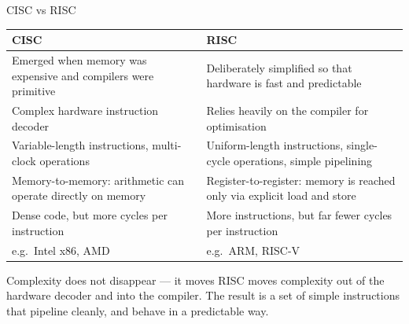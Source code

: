 \documentclass[9pt,aspectratio=169,xcolor=table]{beamer}
\newcommand{\striped}{\rowcolors{1}{white}{stripe}}
\begin{document}
\begin{frame}{CISC vs RISC}
    \begin{center}
    \striped
    \begin{tabular}{p{}p{}}
        \toprule
        \textbf{CISC} & \textbf{RISC} \\
        \midrule
        Emerged when memory was expensive and compilers were primitive & Deliberately simplified so that hardware is fast and \alert{predictable} \\
        Complex hardware instruction decoder & Relies heavily on the compiler for optimisation \\
        Variable-length instructions, multi-clock operations & Uniform-length instructions, single-cycle operations, simple pipelining \\
        \alert{Memory-to-memory}: arithmetic can operate directly on memory & \alert{Register-to-register}: memory is reached only via explicit load and store \\
        Dense code, but more cycles per instruction & More instructions, but far fewer cycles per instruction \\
        e.g.\ Intel x86, AMD & e.g.\ ARM, RISC-V \\
        \bottomrule
    \end{tabular}
    \end{center}
    \vspace{3mm}
    \begin{block}{Complexity does not disappear --- it moves}
        RISC moves complexity out of the hardware decoder and into the compiler. The result is a set of simple instructions that pipeline cleanly, and behave in a predictable way.
    \end{block}
\end{frame}
\end{document}
